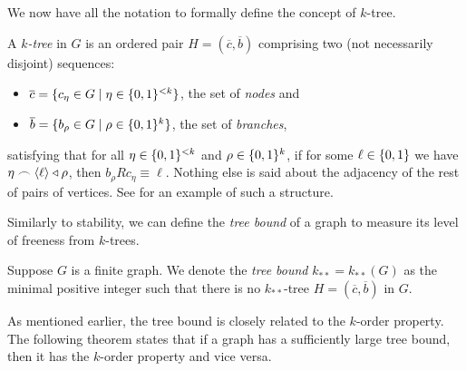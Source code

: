         We now have all the notation to formally define the concept of $k$-tree.

        \begin{definition} \label{def:k-tree}
            A \emph{$k$-tree} in $G$ is an ordered pair $H = (\overline{c},\overline{b})$ comprising two (not necessarily
            disjoint) sequences:
            \begin{itemize}
                \item $\overline{c} = \{  c_\eta \in G \mid \eta \in \{ 0,1 \}^{<k}  \}$, the set of \emph{nodes} and
                \item $\overline{b} = \{  b_\rho \in G \mid \rho \in \{ 0,1 \}^k  \}$, the set of \emph{branches},
            \end{itemize}
            satisfying that for all $\eta \in \{ 0,1 \}^{<k}$ and $\rho \in \{ 0,1 \}^k$,
            if for some $\ell \in \{ 0, 1 \}$ we have $\eta \frown \left< \ell \right> \triangleleft \rho$, then
            $b_\rho R c_\eta \equiv \ell$.
            Nothing else is said about the adjacency of the rest of pairs of vertices.
            See  for an example of such a structure.
        \end{definition}

        

        Similarly to stability, we can define the \emph{tree bound} of a graph to measure its level of freeness from $k$-trees.

        \begin{definition} \label{def:tree_bound}
            Suppose $G$ is a finite graph.
            We denote the \emph{tree bound} $k_{**} = k_{**}(G)$ as the minimal positive integer such that there is no
            $k_{**}$-tree $H = (\overline{c},\overline{b})$ in $G$.
        \end{definition}

        As mentioned earlier, the tree bound is closely related to the $k$-order property.
        The following theorem states that if a graph has a sufficiently large tree bound, then it has the $k$-order property
        and vice versa.

